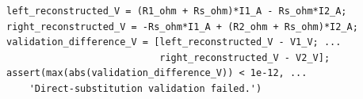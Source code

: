 \documentclass[border=12pt]{standalone}
\begin{document}
\begin{lstlisting}[style=matlab]
left_reconstructed_V = (R1_ohm + Rs_ohm)*I1_A - Rs_ohm*I2_A;
right_reconstructed_V = -Rs_ohm*I1_A + (R2_ohm + Rs_ohm)*I2_A;
validation_difference_V = [left_reconstructed_V - V1_V; ...
                           right_reconstructed_V - V2_V];
assert(max(abs(validation_difference_V)) < 1e-12, ...
    'Direct-substitution validation failed.')
\end{lstlisting}
\end{document}
